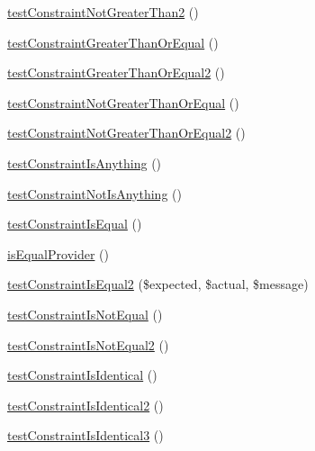\begin{DoxyCompactItemize}
\item 
\mbox{\hyperlink{class_framework___constraint_test_a984fb42b5ce7c4a50bea139cf7a85e1e}{test\+Constraint\+Not\+Greater\+Than2}} ()
\item 
\mbox{\hyperlink{class_framework___constraint_test_a1bd047f15f1619ffec73448a246ed316}{test\+Constraint\+Greater\+Than\+Or\+Equal}} ()
\item 
\mbox{\hyperlink{class_framework___constraint_test_a8a015256f546e784d077c19adfb79d7f}{test\+Constraint\+Greater\+Than\+Or\+Equal2}} ()
\item 
\mbox{\hyperlink{class_framework___constraint_test_a004608e7310bdb986170dc2dea723f3c}{test\+Constraint\+Not\+Greater\+Than\+Or\+Equal}} ()
\item 
\mbox{\hyperlink{class_framework___constraint_test_a9db66538a3590029d4b448627fc07e34}{test\+Constraint\+Not\+Greater\+Than\+Or\+Equal2}} ()
\item 
\mbox{\hyperlink{class_framework___constraint_test_a0a11964759f9faa9f24c3374ac09988c}{test\+Constraint\+Is\+Anything}} ()
\item 
\mbox{\hyperlink{class_framework___constraint_test_aa153f0c1adec6a4bbb8957aa795002cd}{test\+Constraint\+Not\+Is\+Anything}} ()
\item 
\mbox{\hyperlink{class_framework___constraint_test_a791374c5f13bec5204c69171c516f0bb}{test\+Constraint\+Is\+Equal}} ()
\item 
\mbox{\hyperlink{class_framework___constraint_test_a4198d3f731f9e6a29ffb3cd97ec538ef}{is\+Equal\+Provider}} ()
\item 
\mbox{\hyperlink{class_framework___constraint_test_a06e84332b1a39a12dd87c22a6347196b}{test\+Constraint\+Is\+Equal2}} (\$expected, \$actual, \$message)
\item 
\mbox{\hyperlink{class_framework___constraint_test_ad488d9cf37ef0c56a92d878db753cbea}{test\+Constraint\+Is\+Not\+Equal}} ()
\item 
\mbox{\hyperlink{class_framework___constraint_test_a039f9d31ac6d6f25564d16c309481643}{test\+Constraint\+Is\+Not\+Equal2}} ()
\item 
\mbox{\hyperlink{class_framework___constraint_test_a80fab448c17e0cf887ce015482f9524d}{test\+Constraint\+Is\+Identical}} ()
\item 
\mbox{\hyperlink{class_framework___constraint_test_a9aea3f5a9f12e7f429fab8143d396ed1}{test\+Constraint\+Is\+Identical2}} ()
\item 
\mbox{\hyperlink{class_framework___constraint_test_ac02df03ef1703e10259c1da6401d3db1}{test\+Constraint\+Is\+Identical3}} ()

\end{DoxyCompactItemize}
